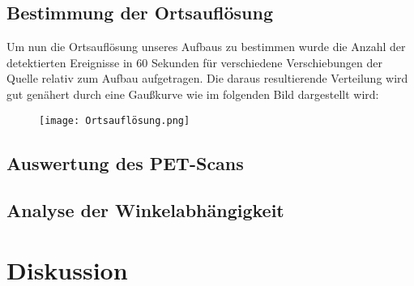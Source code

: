\documentclass{article}
\begin{document}
        \subsection{Bestimmung der Ortsauflösung}
            Um nun die Ortsauflösung unseres Aufbaus zu bestimmen wurde die Anzahl der detektierten Ereignisse in 60 Sekunden
            für verschiedene Verschiebungen der Quelle relativ zum Aufbau aufgetragen. Die daraus resultierende Verteilung wird gut genähert durch eine
            Gaußkurve wie im folgenden Bild dargestellt wird:
            \begin{figure}[H]
                \centering
                \texttt{[image: Ortsauflösung.png]}
                \label{Plot der Ortsauflösungsmessung}
            \end{figure}
             

        \subsection{Auswertung des PET-Scans}
        
        \subsection{Analyse der Winkelabhängigkeit}


    \section{Diskussion}
\end{document}
